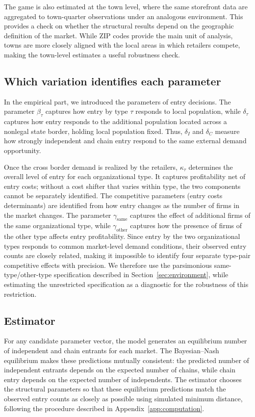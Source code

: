 \documentclass[english,12pt]{article}
\begin{document}
The game is also estimated at the town level, where the same storefront data are aggregated to town-quarter observations under an analogous environment. This provides a check on whether the structural results depend on the geographic definition of the market. While ZIP codes provide the main unit of analysis, towns are more closely aligned with the local areas in which retailers compete, making the town-level estimates a useful robustness check.

\subsection{Which variation identifies each parameter}

In the empirical part, we introduced the parameters of entry decisions. The parameter $\beta_\tau$ captures how entry by type $\tau$ responds to local population, while $\delta_\tau$ captures how entry responds to the additional population located across a nonlegal state border, holding local population fixed. Thus, $\delta_I$ and $\delta_C$ measure how strongly independent and chain entry respond to the same external demand opportunity.

Once the cross border demand is realized by the retailers, $\kappa_\tau$ determines the overall level of entry for each organizational type. It captures profitability net of entry costs; without a cost shifter that varies within type, the two components cannot be separately identified. The competitive parameters (entry costs determinants) are identified from how entry changes as the number of firms in the market changes. The parameter $\gamma_{\text{same}}$ captures the effect of additional firms of the same organizational type, while $\gamma_{\text{other}}$ captures how the presence of firms of the other type affects entry profitability. Since entry by the two organizational types responds to common market-level demand conditions, their observed entry counts are closely related, making it impossible to identify four separate type-pair competitive effects with precision. We therefore use the parsimonious same-type/other-type specification described in Section~\ref{sec:environment}, while estimating the unrestricted specification as a diagnostic for the robustness of this restriction.

\subsection{Estimator}

For any candidate parameter vector, the model generates an equilibrium number of independent and chain entrants for each market. The Bayesian--Nash equilibrium makes these predictions mutually consistent: the predicted number of independent entrants depends on the expected number of chains, while chain entry depends on the expected number of independents. The estimator chooses the structural parameters so that these equilibrium predictions match the observed entry counts as closely as possible using simulated minimum distance, following the procedure described in Appendix~\ref{app:computation}.
\end{document}
